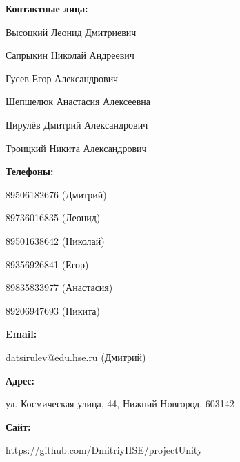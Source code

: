 \item \textbf{Контактные лица:} \par
    Высоцкий Леонид Дмитриевич \par
    Сапрыкин Николай Андреевич \par
    Гусев Егор Александрович \par
    Шепшелюк Анастасия Алексеевна \par
    Цирулёв Дмитрий Александрович \par
    Троицкий Никита Александрович \par
    \item \textbf{Телефоны:} \par
    89506182676 (Дмитрий) \par
    89736016835 (Леонид) \par
    89501638642 (Николай) \par
    89356926841 (Егор) \par
    89835833977 (Анастасия) \par
    89206947693 (Никита) \par
    \item \textbf{Email:} \par
    datsirulev@edu.hse.ru (Дмитрий)
    \item \textbf{Адрес:} \par
    ул. Космическая улица, 44, Нижний Новгород, 603142
    \item \textbf{Сайт:} \par
    https://github.com/DmitriyHSE/projectUnity